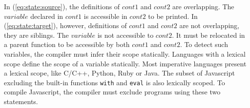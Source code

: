 In (\ref{eq:state:source}), the definitions of $cont1$ and $cont2$ are overlapping.
The $variable$ declared in $cont1$ is accessible in $cont2$ to be printed.
In (\ref{eq:state:target}), however, definitions of $cont1$ and $cont2$ are not overlapping, they are siblings.
The $variable$ is not accessible to $cont2$.
It must be relocated in a parent function to be accessible by both $cont1$ and $cont2$.
To detect such variables, the compiler must infer their scope statically.
Languages with a lexical scope define the scope of a variable statically.
Most imperative languages present a lexical scope, like C/C++, Python, Ruby or Java.
The subset of Javascript excluding the built-in functions \texttt{with} and \texttt{eval} is also lexically scoped.
To compile Javascript, the compiler must exclude programs using these two statements.